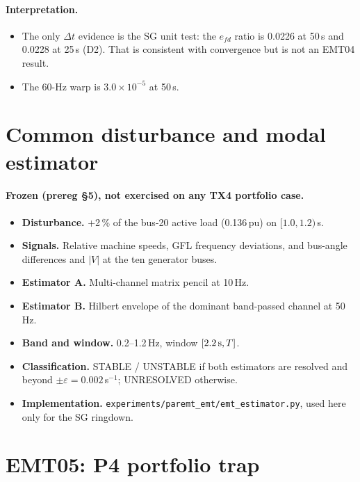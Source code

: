 \documentclass[10pt,a4paper]{article}
\newcommand{\us}{\,\textmu s}
\newcommand{\sinv}{\,s$^{-1}$}
\newcommand{\f}[1]{\nolinkurl{#1}}
\begin{document}
\paragraph{Interpretation.}
\begin{itemize}
\item The only $\Delta t$ evidence is the SG unit test: the $e_{fd}$ ratio is
  0.0226 at 50\us{} and 0.0228 at 25\us{} (D2). That is consistent with
  convergence but is not an EMT04 result.
\item The 60-Hz warp is $3.0\times10^{-5}$ at 50\us.
\end{itemize}

\section{Common disturbance and modal estimator}

\paragraph{Frozen (prereg \S5), not exercised on any TX4 portfolio case.}
\begin{itemize}
\item \textbf{Disturbance.} +2\,\% of the bus-20 active load (0.136\,pu) on
  $[1.0,1.2)$\,s.
\item \textbf{Signals.} Relative machine speeds, GFL frequency deviations, and
  bus-angle differences and $|V|$ at the ten generator buses.
\item \textbf{Estimator A.} Multi-channel matrix pencil at 10\,Hz.
\item \textbf{Estimator B.} Hilbert envelope of the dominant band-passed
  channel at 50\,Hz.
\item \textbf{Band and window.} 0.2--1.2\,Hz, window $[2.2\,{\rm s},T]$.
\item \textbf{Classification.} STABLE / UNSTABLE if both estimators are
  resolved and beyond $\pm\varepsilon=0.002$\sinv; UNRESOLVED otherwise.
\item \textbf{Implementation.} \f{experiments/paremt_emt/emt_estimator.py},
  used here only for the SG ringdown.
\end{itemize}

\section{EMT05: P4 portfolio trap}\label{sec:core}
\end{document}
